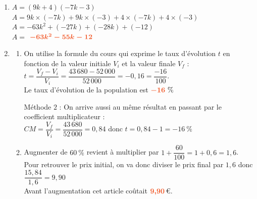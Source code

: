 \documentclass[a4paper,11pt]{article}
\begin{document}
{\begin{seanceD}{}
\begin{enumerate}
\item  $A =  (9k+4)(-7k-3)$ \\$A =  9k\times (-7k) + 
  9k\times (-3) +
  4 \times (-7k)  +
  4 \times (-3)$ \\$A = -63k^2 + 
  (-27k) +
  (-28k) +
  (-12)$ \\$A =$ ${\color[HTML]{f15929}\boldsymbol{ -63k^2-55k-12 }}$


\item \begin{enumerate}
\item On utilise la formule du cours qui exprime le taux d'évolution $t$ en fonction de la valeur initiale $V_i$ et la valeur finale $V_f$ : $t=\dfrac{V_f-V_i}{V_i}=\dfrac{43\,680-52\,000}{52\,000}=-0{,}16=\dfrac{-16}{100}$.\\Le taux d'évolution de la population est ${\color[HTML]{f15929}\boldsymbol{-16}}~\%$

\medskip
Méthode $2$ : On arrive aussi au même résultat en passant par le coefficient multiplicateur : \\$CM=\dfrac{V_f}{V_i}=\dfrac{43\,680}{52\,000} = 0{,}84$ donc $t = 0{,}84-1= -16~\%$
\item Augmenter de $60~\%$ revient à multiplier par $1 + \dfrac{60}{100} = 1+ 0{,}6 = 1{,}6$.\\Pour retrouver le prix initial, on va donc diviser le prix final par $1{,}6$ donc $\dfrac{15{,}84}{1{,}6}  = 9{,}90$\\Avant l'augmentation cet article coûtait ${\color[HTML]{f15929}\boldsymbol{9{,}90}}$\,\euro{}.
\end{enumerate}



\end{enumerate}
\end{seanceD}}


\newpage
\end{document}
